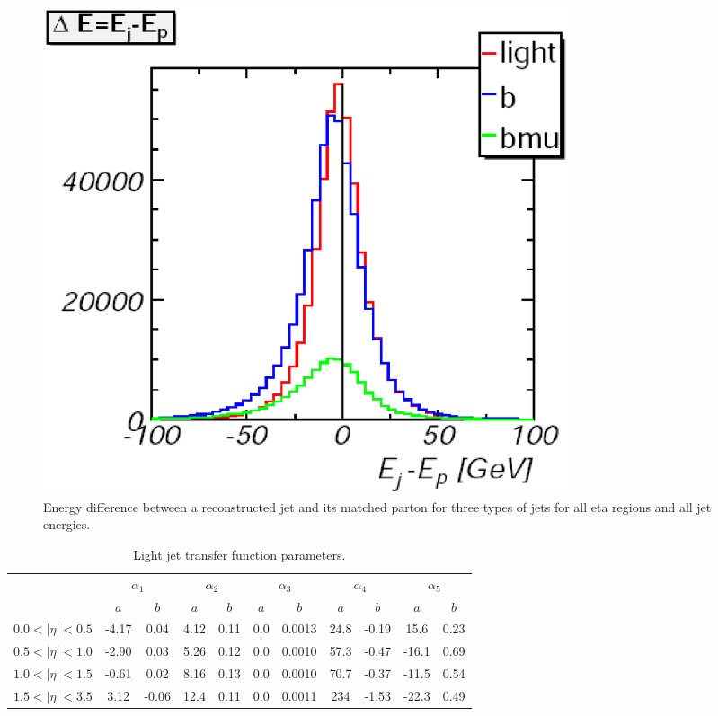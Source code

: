 \begin{itemize}
\begin{itemize}
\begin{figure}[!h!tbp]
\begin{center}
\includegraphics[width=0.75\textwidth]{eps/MatrixElement/transfer/tfs}
\vspace{-0.1in}
\caption{Energy difference between a reconstructed jet and its matched parton
for three types of jets for all eta regions and all jet energies.}
\label{FlavorTF}
\end{center}
\end{figure}


\begin{table}[!h!tbp]
\begin{center}
\caption{Light jet transfer function parameters.}
\label{lightjettfparams}
\begin{tabular}{c|cc|cc|cc|cc|cc}
&	\multicolumn{2}{c|}{$\alpha_{1}$}		& \multicolumn{2}{c|}{$\alpha_{2}$} 
&	\multicolumn{2}{c|}{$\alpha_{3}$}		& \multicolumn{2}{c|}{$\alpha_{4}$} 
&	\multicolumn{2}{c}{$\alpha_{5}$}		\\
				& 	$a$	&	$b$	&	$a$	&	$b$	& 	$a$	&	$b$	& 	$a$	&	$b$	& 	$a$	&	$b$	\\	
\hline
$0.0<|\eta|<0.5$	& -4.17	& 0.04	& 4.12	& 0.11	& 0.0		& 0.0013	& 24.8	& -0.19	& 15.6	& 0.23	\\
$0.5<|\eta|<1.0$	& -2.90	& 0.03	& 5.26	& 0.12	& 0.0		& 0.0010	& 57.3	& -0.47	& -16.1	& 0.69	\\
$1.0<|\eta|<1.5$	& -0.61	& 0.02	& 8.16	& 0.13	& 0.0		& 0.0010	& 70.7	& -0.37	& -11.5	& 0.54	\\
$1.5<|\eta|<3.5$	& 3.12	& -0.06	& 12.4	& 0.11	& 0.0		& 0.0011	& 234	& -1.53	& -22.3	& 0.49	\\
\end{tabular}
\vspace{-0.1 in}
\end{center}
\end{table} 



\end{itemize}
\end{itemize}

